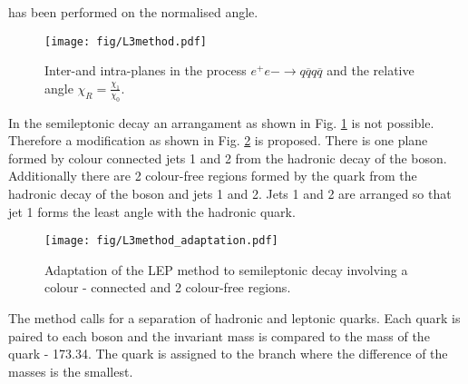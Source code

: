 has been performed on the normalised angle. 

\begin{figure}[hbtp]
  \centering
  \texttt{[image: fig/L3method.pdf]}
  \caption{Inter-\PW and intra-\PW planes in the process $e^{+}e{-}\rightarrow q\overline{q}q\overline{q}$ and the relative angle $\chi_{R}=\frac{\chi_{1}}{\chi_{0}}$.}
  \label{fig:LEP_method}
\end{figure}

In the \ttbar semileptonic decay an arrangament as shown in Fig. \ref{fig:LEP_method} is not possible. Therefore a modification as shown in Fig. \ref{fig:LEP_method_adaptation} is proposed. There is one plane formed by colour connected jets 1 and 2 from the hadronic decay of the \PW boson. Additionally there are 2 colour-free regions formed by the \cPqb quark from the hadronic decay of the \PW boson and jets 1 and 2. Jets 1 and 2 are arranged so that jet 1 forms the least angle with the hadronic \cPqb quark. 

\begin{figure}[hbtp]
  \centering
  \texttt{[image: fig/L3method\_adaptation.pdf]}
  \caption{Adaptation of the LEP method to \ttbar semileptonic decay involving a colour - connected and 2 colour-free regions.}
  \label{fig:LEP_method_adaptation}
\end{figure}

The method calls for a separation of hadronic and leptonic \cPqb quarks. Each \cPqb quark is paired to each \PW boson and the invariant mass is compared to the mass of the \cPqt quark - 173.34\GeV. The \cPqb quark is assigned to the branch where the difference of the masses is the smallest. 
